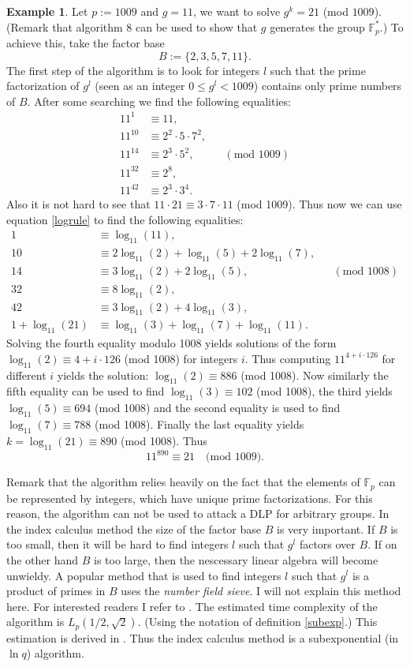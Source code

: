 \documentclass{article}
\numberwithin{equation}{section}
\theoremstyle{definition}
\newtheorem{example}[theorem]{Example}
\newcommand{\FF}[1]{{\mathbb F}_{#1}} %
\begin{document}
\begin{example}
Let $p:=1009$ and $g=11$, we want to solve $g^k=21$ (mod $1009$). (Remark that algorithm 8 can be used to show that $g$ generates the group $\FF{p}^*$.) To achieve this, take the factor base $$B:=\{2,3,5,7,11\}.$$ The first step of the algorithm is to look for integers $l$ such that the prime factorization of $g^l$ (seen as an integer $0 \leq g^l < 1009$) contains only prime numbers of $B$. After some searching we find the following equalities:
\begin{align*}
11^1 &\equiv 11, \\
11^{10} &\equiv 2^2\cdot5\cdot7^2,\\
11^{14} &\equiv 2^3\cdot 5^2, &&(\text{mod } 1009)\\
11^{32} &\equiv 2^8,\\
11^{42} &\equiv 2^3\cdot3^4.
\end{align*}
Also it is not hard to see that $11\cdot 21 \equiv 3\cdot7\cdot11$ (mod 1009). Thus now we can use equation \ref{logrule} to find the following equalities:
\begin{align*}
1 &\equiv \log_{11}(11),\\
10 &\equiv 2\log_{11}(2)+\log_{11}(5)+2\log_{11}(7),\\
14 &\equiv 3\log_{11}(2)+2\log_{11}(5), &&(\text{mod }1008)\\
32 &\equiv 8\log_{11}(2),\\
42 &\equiv 3 \log_{11}(2)+4\log_{11}(3),\\
1+\log_{11}(21) &\equiv \log_{11}(3)+\log_{11}(7)+\log_{11}(11).
\end{align*}
Solving the fourth equality modulo 1008 yields solutions of the form $\log_{11}(2)\equiv 4+i\cdot126$ (mod 1008) for integers $i$. Thus computing $11^{4+i\cdot126}$ for different $i$ yields the solution: $\log_{11}(2) \equiv 886$ (mod 1008). Now similarly the fifth equality can be used to find $\log_{11}(3)\equiv102$ (mod 1008), the third yields $\log_{11}(5) \equiv 694$ (mod 1008) and the second equality is used to find $\log_{11}(7) \equiv 788$ (mod 1008). Finally the last equality yields $k=\log_{11}(21) \equiv 890$ (mod 1008). Thus $$11^{890} \equiv 21 \quad \text{(mod 1009)}.$$
\end{example}

Remark that the algorithm relies heavily on the fact that the elements of $\FF{p}$ can be represented by integers, which have unique prime factorizations. For this reason, the algorithm can not be used to attack a DLP for arbitrary groups.  In the index calculus method the size of the factor base $B$ is very important. If $B$ is too small, then it will be hard to find integers $l$ such that $g^l$ factors over $B$. If on the other hand $B$ is too large, then the nescessary linear algebra will become unwieldy. A popular method that is used to find integers $l$ such that $g^l$ is a product of primes in $B$ uses the \emph{number field sieve}. I will not explain this method here. For interested readers I refer to \cite{numbersieve}. The estimated time complexity of the algorithm is  $L_p(1/2,\sqrt{2})$. (Using the notation of definition \ref{subexp}.) This estimation is derived in \cite[p.129]{handbookcrypto}. Thus the index calculus method is a subexponential (in $\ln q$) algorithm.
\end{document}
